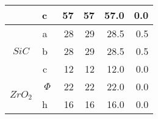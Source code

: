 \begin{table}[H]
{\begin{tabular}{|c|c|r|r|r|r|}
                                                                                                     & c~       & 57                                                                              & 57                                                                              & 57.0                                                                               & 0.0                                                                                   \\ \hline
    \multirow{3}{*}{$SiC$}                                                                           & a~       & 28                                                                              & 29                                                                              & 28.5                                                                               & 0.5                                                                                   \\ \cline{2-6} 
                                                                                                     & b~       & 28                                                                              & 29                                                                              & 28.5                                                                               & 0.5                                                                                   \\ \cline{2-6} 
                                                                                                     & c~       & 12                                                                              & 12                                                                              & 12.0                                                                               & 0.0                                                                                   \\ \hline
    \multirow{2}{*}{$ZrO_2$}                                                                         & $\Phi$   & 22                                                                              & 22                                                                              & 22.0                                                                               & 0.0                                                                                   \\ \cline{2-6} 
                                                                                                     & h~       & 16                                                                              & 16                                                                              & 16.0                                                                               & 0.0                                                                                   \\ \hline

\end{tabular}}
\end{table}
